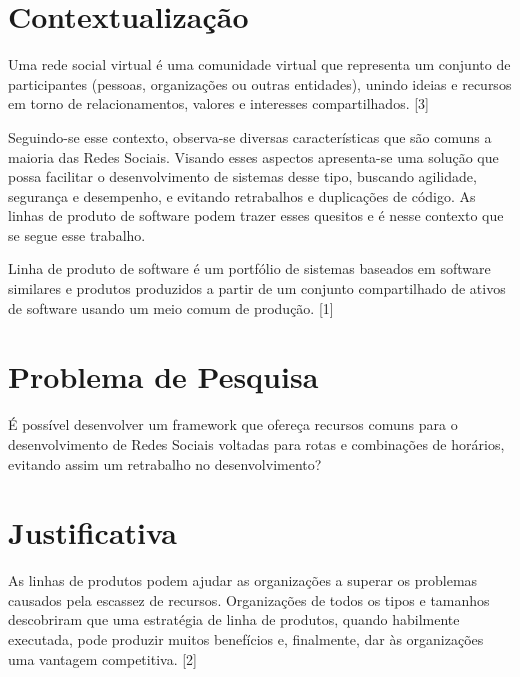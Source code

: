 









\frenchspacing 
\imprimircapa

\textual

\section*{Contextualização}

Uma rede social virtual é uma comunidade virtual que representa um conjunto de participantes (pessoas, organizações ou outras entidades), unindo ideias e recursos em torno de relacionamentos, valores e interesses compartilhados. [3]

Seguindo-se esse contexto, observa-se diversas características que são comuns a maioria das Redes Sociais. Visando esses aspectos apresenta-se uma solução que possa facilitar o desenvolvimento de sistemas desse tipo, buscando agilidade, segurança e desempenho, e evitando retrabalhos e duplicações de código. As linhas de produto de software podem trazer esses quesitos e é nesse contexto que se segue esse trabalho.

Linha de produto de software é um portfólio de sistemas baseados em software similares e produtos produzidos a partir de um conjunto compartilhado de ativos de software usando um meio comum de produção. [1]

\section*{Problema de Pesquisa}

É possível desenvolver um framework que ofereça recursos comuns para o desenvolvimento de Redes Sociais voltadas para rotas e combinações de horários, evitando assim um retrabalho no desenvolvimento?

\section*{Justificativa}

As linhas de produtos podem ajudar as organizações a superar os problemas causados pela escassez de recursos. Organizações de todos os tipos e tamanhos descobriram que uma estratégia de linha de produtos, quando habilmente executada, pode produzir muitos benefícios e, finalmente, dar às organizações uma vantagem competitiva. [2]

